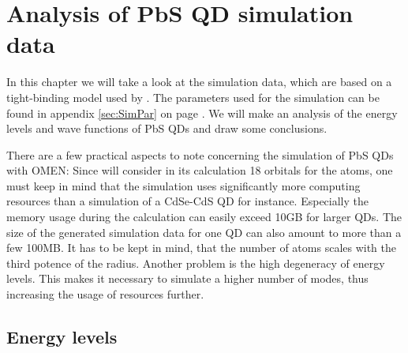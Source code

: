 \chapter{Analysis of PbS QD simulation data}

In this chapter we will take a look at the simulation data, which are based on a tight-binding model used by \omen. The parameters used for the simulation can be found in appendix \ref{sec:SimPar} on page \pageref{sec:SimPar}. We will make an analysis of the energy levels and wave functions of PbS QDs and draw some conclusions.\\

\begin{REMARK} 
There are a few practical aspects to note concerning the simulation of PbS QDs with OMEN: Since \omen will consider in its calculation 18 orbitals for the atoms, one must keep in mind that the simulation uses significantly more computing resources than a simulation of a CdSe-CdS QD for instance. Especially the memory usage during the calculation can easily exceed 10GB for larger QDs. The size of the generated simulation data for one QD can also amount to more than a few 100MB. It has to be kept in mind, that the number of atoms scales with the third potence of the radius. Another problem is the high degeneracy of energy levels. This makes it necessary to simulate a higher number of modes, thus increasing the usage of resources further.
\end{REMARK}

\section{Energy levels}

